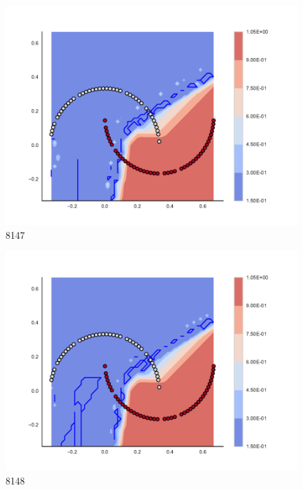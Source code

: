 \begin{subfigure}[b]{0.09\textwidth}
    \includegraphics[clip, trim=2.35cm 1.75cm 4.5cm 0cm,width=\textwidth]{img/convergence/8147.pdf}
    \caption{8147}
    \label{fig:convergence_8147}
\end{subfigure}
%
\begin{subfigure}[b]{0.09\textwidth}
    \includegraphics[clip, trim=2.35cm 1.75cm 4.5cm 0cm,width=\textwidth]{img/convergence/8148.pdf}
    \caption{8148}
    \label{fig:convergence_8148}
\end{subfigure}
%
